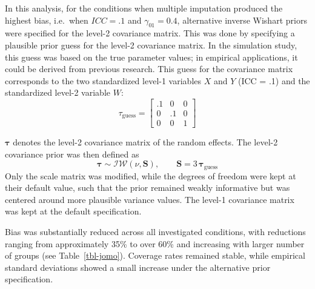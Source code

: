 \documentclass[
  letterpaper,
  11pt,
  english,
  singlespacing,
  headsepline,
  openany]{MastersDoctoralThesis}
\begin{document}
In this analysis, for the conditions when multiple imputation produced
the highest bias, i.e.~when \(ICC = .1\) and \(\gamma_{01} = 0.4\),
alternative inverse Wishart priors were specified for the level-2
covariance matrix. This was done by specifying a plausible prior guess
for the level-2 covariance matrix. In the simulation study, this guess
was based on the true parameter values; in empirical applications, it
could be derived from previous research. This guess for the covariance
matrix corresponds to the two standardized level-1 variables \(X\) and
\(Y\) (ICC = .1) and the standardized level-2 variable \(W\): \[
\tau_{\text{guess}} =
\begin{bmatrix}
.1 & 0   & 0 \\
0   & .1 & 0 \\
0   & 0   & 1
\end{bmatrix}
\]

\(\boldsymbol{\tau}\) denotes the level-2 covariance matrix of the
random effects. The level-2 covariance prior was then defined as \[
\boldsymbol{\tau} \sim \mathcal{IW}(\nu, \mathbf{S}),
\qquad
\mathbf{S} = 3\,\boldsymbol{\tau}_{\text{guess}}
\] Only the scale matrix was modified, while the degrees of freedom were
kept at their default value, such that the prior remained weakly
informative but was centered around more plausible variance values. The
level-1 covariance matrix was kept at the default specification.

Bias was substantially reduced across all investigated conditions, with
reductions ranging from approximately 35\% to over 60\% and increasing
with larger number of groups (see Table~\ref{tbl-jomo}). Coverage rates
remained stable, while empirical standard deviations showed a small
increase under the alternative prior specification.
\end{document}
